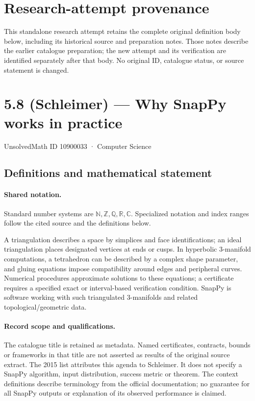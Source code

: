 \documentclass[11pt]{article}
\begin{document}
\section*{Research-attempt provenance}
This standalone research attempt retains the complete original definition body below,
including its historical source and preparation notes. Those notes describe the
earlier catalogue preparation; the new attempt and its verification are identified
separately after that body. No original ID, catalogue status, or source statement is changed.

\section{5.8 (Schleimer) — Why SnapPy works in practice}\label{10900033}
{\small UnsolvedMath ID 10900033 · Computer Science}
\subsection{Definitions and mathematical statement}

\paragraph{Shared notation.}Standard number systems are $\mathbb N,\mathbb Z,\mathbb Q,\mathbb R,\mathbb C$. Specialized notation and index ranges follow the cited source and the definitions below.


A triangulation describes a space by simplices and face identifications; an ideal triangulation places designated vertices at ends or cusps. In hyperbolic $3$-manifold computations, a tetrahedron can be described by a complex shape parameter, and gluing equations impose compatibility around edges and peripheral curves. Numerical procedures approximate solutions to these equations; a certificate requires a specified exact or interval-based verification condition. SnapPy is software working with such triangulated $3$-manifolds and related topological/geometric data.
\paragraph{Record scope and qualifications.}
The catalogue title is retained as metadata. Named certificates, contracts, bounds or frameworks in that title are not asserted as results of the original source extract.
The 2015 list attributes this agenda to Schleimer. It does not specify a SnapPy algorithm, input distribution, success metric or theorem. The context definitions describe terminology from the official documentation; no guarantee for all SnapPy outputs or explanation of its observed performance is claimed.
\end{document}
